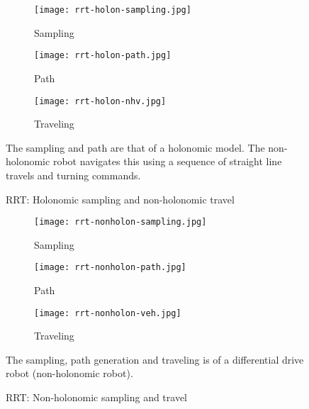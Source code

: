\begin{figure}[ht]
    \centering
    \begin{subfigure}[b]{0.3\textwidth}
        \texttt{[image: rrt-holon-sampling.jpg]}
        \caption{Sampling}
    \end{subfigure}
    \begin{subfigure}[b]{0.3\textwidth}
        \texttt{[image: rrt-holon-path.jpg]}
        \caption{Path}
    \end{subfigure}
    \begin{subfigure}[b]{0.3\textwidth}
        \texttt{[image: rrt-holon-nhv.jpg]}
        \caption{Traveling}
    \end{subfigure}
    \caption{RRT: Holonomic sampling and non-holonomic travel}
    \label{fig:rrt-holo}
    \small
        The sampling and path are that of a holonomic model. The non-holonomic robot navigates this using a sequence of straight line travels and turning commands.
\end{figure}

\begin{figure}[ht]
    \centering
    \begin{subfigure}[b]{0.3\textwidth}
        \texttt{[image: rrt-nonholon-sampling.jpg]}
        \caption{Sampling}
    \end{subfigure}
    \begin{subfigure}[b]{0.3\textwidth}
        \texttt{[image: rrt-nonholon-path.jpg]}
        \caption{Path}
    \end{subfigure}
    \begin{subfigure}[b]{0.3\textwidth}
        \texttt{[image: rrt-nonholon-veh.jpg]}
        \caption{Traveling}
    \end{subfigure}
    \caption{RRT: Non-holonomic sampling and travel}
    \label{fig:rrt-nonholo}
    \small
        The sampling, path generation and traveling is of a differential drive robot (non-holonomic robot).
\end{figure}
